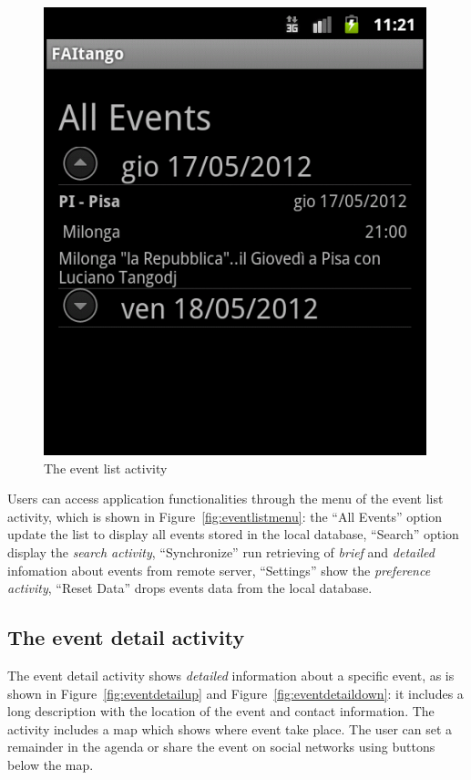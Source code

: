 \documentclass[12pt, twoside]{article}
\begin{document}
\begin{figure}[h]
\begin{center}
\includegraphics[scale=0.60]{fig/allevents-brief.png}
\end{center}
\caption{The event list activity}
\label{fig:eventlist}
\end{figure}

Users can access application functionalities through the menu of the event list activity, which is shown in Figure~\ref{fig:eventlistmenu}: the ``All Events'' option update the list to display all events stored in the local database, ``Search'' option display the \emph{search activity}, ``Synchronize'' run retrieving of \emph{brief} and \emph{detailed} infomation about events from remote server, ``Settings'' show the \emph{preference activity}, ``Reset Data'' drops events data from the local database.

\subsection{The event detail activity}

The event detail activity shows \emph{detailed} information about a specific event, as is shown in Figure~\ref{fig:eventdetailup} and Figure~\ref{fig:eventdetaildown}: it includes a long description with the location of the event and contact information. The activity includes a map which shows where event take place. The user can set a remainder in the agenda or share the event on social networks using buttons below the map.
\end{document}
